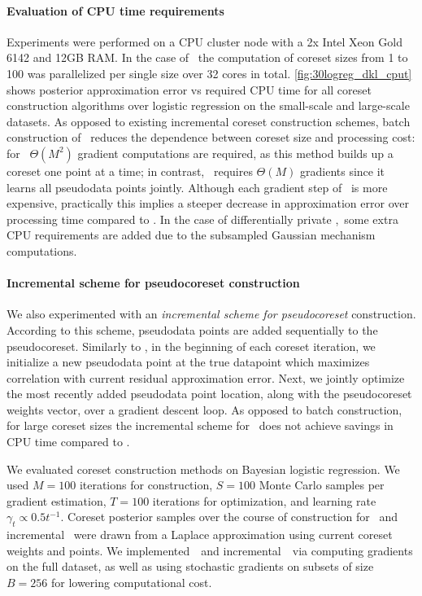 \paragraph{Evaluation of CPU time requirements} Experiments were performed on a CPU cluster node with a 2x Intel Xeon Gold 6142 and 12GB RAM. In the case of \psvi~the computation of coreset sizes from 1 to 100 was parallelized per single size over 32 cores in total. \cref{fig:30logreg_dkl_cput} shows posterior approximation error vs required CPU time for all coreset construction algorithms over logistic regression on the small-scale and large-scale datasets. As opposed to existing incremental coreset construction schemes, batch construction of \psvi~reduces the dependence between coreset size and processing cost: for \sparsevi~$\Theta(M^2)$ gradient computations are required, as this method builds up a coreset one point at a time; in contrast, \psvi~requires $\Theta(M)$ gradients since it learns all pseudodata points jointly. Although each gradient step of \psvi~is more expensive, practically this implies a steeper decrease in approximation error over processing time compared to \sparsevi. In the case of differentially private \psvi,~some extra CPU requirements are added due to the subsampled Gaussian mechanism computations.

\paragraph{Incremental scheme for pseudocoreset construction} We also experimented with an \emph{incremental scheme for pseudocoreset} construction. According to this scheme, pseudodata points are added sequentially to the pseudocoreset. Similarly to \sparsevi, in the beginning of each coreset iteration, we initialize a new pseudodata point at the true datapoint which maximizes correlation with current residual approximation error. Next, we jointly optimize the most recently added pseudodata point location, along with the pseudocoreset weights vector, over a gradient descent loop.  As opposed to batch construction, for large coreset sizes the incremental scheme for \psvi~does not achieve savings in CPU time compared to \sparsevi.

We evaluated coreset construction methods on Bayesian logistic regression. We used $M=100$ iterations for construction, $ S=100 $ Monte Carlo samples per gradient estimation, $ T= 100$ iterations for optimization, and learning rate $\gamma_t \propto 0.5t^{-1}$. Coreset posterior samples over the course of construction
for \sparsevi~and incremental \psvi~were drawn from a Laplace approximation using current
coreset weights and points. We implemented~\sparsevi~and incremental~\psvi~via computing gradients on the full dataset, as well as using stochastic gradients on subsets of size $B=256$ for lowering computational cost. 

